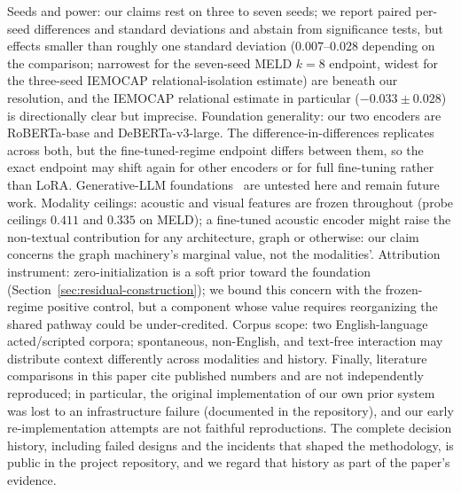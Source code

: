 Seeds and power: our claims rest on three to seven seeds; we report paired per-seed differences and standard deviations and abstain from significance tests, but effects smaller than roughly one standard deviation ($0.007$--$0.028$ depending on the comparison; narrowest for the seven-seed MELD $k{=}8$ endpoint, widest for the three-seed IEMOCAP relational-isolation estimate) are beneath our resolution, and the IEMOCAP relational estimate in particular ($-0.033 \pm 0.028$) is directionally clear but imprecise. Foundation generality: our two encoders are RoBERTa-base and DeBERTa-v3-large. The difference-in-differences replicates across both, but the fine-tuned-regime endpoint differs between them, so the exact endpoint may shift again for other encoders or for full fine-tuning rather than LoRA. Generative-LLM foundations~\cite{zhang2025dialoguellm} are untested here and remain future work. Modality ceilings: acoustic and visual features are frozen throughout (probe ceilings $0.411$ and $0.335$ on MELD); a fine-tuned acoustic encoder might raise the non-textual contribution for any architecture, graph or otherwise: our claim concerns the graph machinery's marginal value, not the modalities'. Attribution instrument: zero-initialization is a soft prior toward the foundation (Section~\ref{sec:residual-construction}); we bound this concern with the frozen-regime positive control, but a component whose value requires reorganizing the shared pathway could be under-credited. Corpus scope: two English-language acted/scripted corpora; spontaneous, non-English, and text-free interaction may distribute context differently across modalities and history. Finally, literature comparisons in this paper cite published numbers and are not independently reproduced; in particular, the original implementation of our own prior system was lost to an infrastructure failure (documented in the repository), and our early re-implementation attempts are not faithful reproductions. The complete decision history, including failed designs and the incidents that shaped the methodology, is public in the project repository, and we regard that history as part of the paper's evidence.
